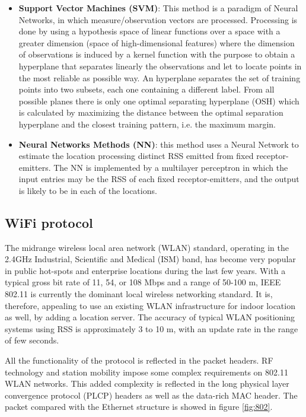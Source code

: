 \begin{itemize}
\item \textbf{Support Vector Machines (SVM)}: This method is a paradigm of Neural Networks, in which measure/observation vectors are processed. Processing is done by using a hypothesis space of linear functions over a space with a greater dimension (space of high-dimensional features) where the dimension of observations is induced by a kernel function with the purpose to obtain a hyperplane that separates linearly the observations and let to locate points in the most reliable as possible way. An hyperplane separates the set of training points into two subsets, each one containing a different label. From all possible planes there is only one optimal separating hyperplane (OSH) which is calculated by maximizing the distance between the optimal separation hyperplane and the closest training pattern, i.e. the maximum margin.

\item \textbf{Neural Networks Methods (NN)}: this method uses a Neural Network to estimate the location processing distinct RSS emitted from fixed receptor-emitters. The NN is implemented by a multilayer perceptron in which the input entries may be the RSS of each fixed receptor-emitters, and the output is likely to be in each of the locations.

\end{itemize}


\subsection{WiFi protocol}
The midrange wireless local area network (WLAN) standard, operating in the 2.4GHz Industrial, Scientific and Medical (ISM) band, has become very popular in public hot-spots and enterprise locations during the last few years. With a typical gross bit rate of 11, 54, or 108 Mbps and a range of 50-100 m, IEEE 802.11 is currently the dominant local wireless networking standard. It is, therefore, appealing to use an existing WLAN infrastructure for indoor location as well, by adding a location server. The accuracy of typical WLAN positioning systems using RSS is approximately 3 to 10 m, with an update rate in the range of few seconds.

All the functionality of the protocol is reflected in the packet headers. RF technology and station mobility impose some complex requirements on 802.11 WLAN networks. This added complexity is reflected in the long physical layer convergence protocol (PLCP) headers as well as the data-rich MAC header. The packet compared with the Ethernet structure is showed in figure \ref{fig:802}.

